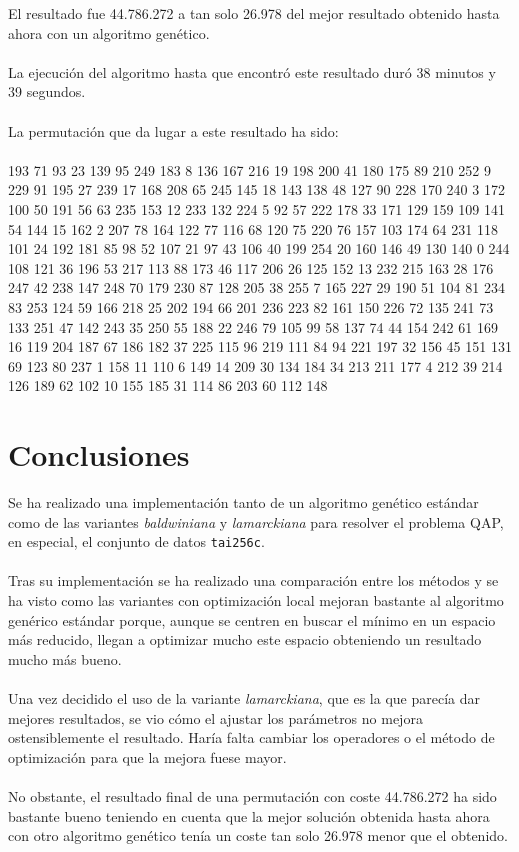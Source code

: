 El resultado fue 44.786.272 a tan solo 26.978 del mejor resultado obtenido hasta ahora con un algoritmo genético.
\\ \\
La ejecución del algoritmo hasta que encontró este resultado duró 38 minutos y 39 segundos.
\\ \\
La permutación que da lugar a este resultado ha sido: 
\\ \\
193 71 93 23 139 95 249 183 8 136 167 216 19 198 200 41 180 175 89 210 252 9 229 91 195 27 239 17 168 208 65 245 145 18 143 138 48 127 90 228 170 240 3 172 100 50 191 56 63 235 153 12 233 132 224 5 92 57 222 178 33 171 129 159 109 141 54 144 15 162 2 207 78 164 122 77 116 68 120 75 220 76 157 103 174 64 231 118 101 24 192 181 85 98 52 107 21 97 43 106 40 199 254 20 160 146 49 130 140 0 244 108 121 36 196 53 217 113 88 173 46 117 206 26 125 152 13 232 215 163 28 176 247 42 238 147 248 70 179 230 87 128 205 38 255 7 165 227 29 190 51 104 81 234 83 253 124 59 166 218 25 202 194 66 201 236 223 82 161 150 226 72 135 241 73 133 251 47 142 243 35 250 55 188 22 246 79 105 99 58 137 74 44 154 242 61 169 16 119 204 187 67 186 182 37 225 115 96 219 111 84 94 221 197 32 156 45 151 131 69 123 80 237 1 158 11 110 6 149 14 209 30 134 184 34 213 211 177 4 212 39 214 126 189 62 102 10 155 185 31 114 86 203 60 112 148

\section{Conclusiones}

Se ha realizado una implementación tanto de un algoritmo genético estándar como de las variantes \textit{baldwiniana} y \textit{lamarckiana} para resolver el problema QAP, en especial, el conjunto de datos \texttt{tai256c}.
\\ \\
Tras su implementación se ha realizado una comparación entre los métodos y se ha visto como las variantes con optimización local mejoran bastante al algoritmo genérico estándar porque, aunque se centren en buscar el mínimo en un espacio más reducido, llegan a optimizar mucho este espacio obteniendo un resultado mucho más bueno.
\\ \\
Una vez decidido el uso de la variante \textit{lamarckiana}, que es la que parecía dar mejores resultados, se vio cómo el ajustar los parámetros no mejora ostensiblemente el resultado. Haría falta cambiar los operadores o el método de optimización para que la mejora fuese mayor.
\\ \\
No obstante, el resultado final de una permutación con coste 44.786.272 ha sido bastante bueno teniendo en cuenta que la mejor solución obtenida hasta ahora con otro algoritmo genético tenía un coste tan solo 26.978 menor que el obtenido.


